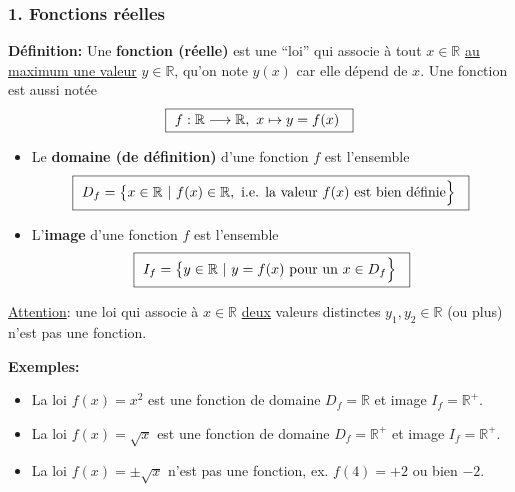 \documentclass[10pt]{beamer}
\newcommand{\bitem}{\item[$\bullet$]}
\newcommand{\R}{\mathbb R}
\begin{document}
\begin{frame}
\frametitle{\bf 1. Fonctions r\'eelles}
\medskip 

{\bf D\'efinition:} 
Une {\bf fonction (r\'eelle)} est une ``loi'' qui associe 
\`a tout $x\in\R$ \underline{au maximum une valeur} $y\in\R$, 
qu'on note $y(x)$ car elle d\'epend de $x$. Une fonction est aussi not\'ee 
$$\mbox{\framebox{\ 
$f:\R\longrightarrow \R,\ x\mapsto y=f(x)$
\ }} $$
\vspace*{-5mm}

\pause
\begin{itemize}
\bitem
Le {\bf domaine (de d\'efinition)} d'une fonction $f$ est l'ensemble 
\vspace*{-1mm}
$$\mbox{\framebox{\ 
$D_f=\big\{ x\in\R\ |\ f(x)\in\R,\ 
\mbox{i.e. la valeur $f(x)$ est bien d\'efinie}\Big\}$
\ }} $$
\vspace*{-3mm}

\bitem
L'{\bf image} d'une fonction $f$ est l'ensemble 
\vspace*{-1mm}
$$\mbox{\framebox{\ 
$I_f=\big\{ y\in\R\ |\ y=f(x)\ \mbox{pour un $x\in D_f$} \Big\}$
\ }} $$
\end{itemize}
\vspace*{1mm}

\pause
\underline{Attention}: une loi qui associe \`a $x\in\R$ 
\underline{deux} valeurs distinctes $y_1,y_2\in\R$ (ou plus) 
n'est pas une fonction.  
\vspace*{2mm}

\pause
{\small 
{\bf Exemples:}
\begin{itemize}
\bitem
La loi $f(x)=x^2$ est une fonction de domaine $D_f\!=\!\R$ et image $I_f\!=\!\R^+$.
\bitem
La loi $f(x)=\sqrt{x}$ est une fonction de domaine $D_f\!=\!\R^+$ et image $I_f\!=\!\!\R^+$.
\bitem
La loi $f(x)=\pm\sqrt{x}$ n'est pas une fonction, ex. $f(4)=+2$ ou bien $-2$. 
\end{itemize}
}

\end{frame}

\end{document}
